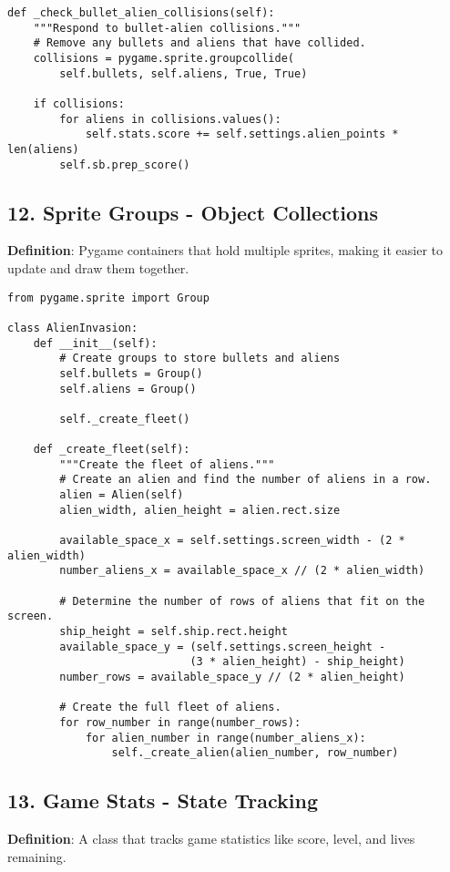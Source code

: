 \begin{lstlisting}
def _check_bullet_alien_collisions(self):
    """Respond to bullet-alien collisions."""
    # Remove any bullets and aliens that have collided.
    collisions = pygame.sprite.groupcollide(
        self.bullets, self.aliens, True, True)
    
    if collisions:
        for aliens in collisions.values():
            self.stats.score += self.settings.alien_points * len(aliens)
        self.sb.prep_score()
\end{lstlisting}

\subsection*{12. Sprite Groups - Object Collections}
\textbf{Definition}: Pygame containers that hold multiple sprites, making it easier to update and draw them together.

\begin{lstlisting}
from pygame.sprite import Group

class AlienInvasion:
    def __init__(self):
        # Create groups to store bullets and aliens
        self.bullets = Group()
        self.aliens = Group()
        
        self._create_fleet()
    
    def _create_fleet(self):
        """Create the fleet of aliens."""
        # Create an alien and find the number of aliens in a row.
        alien = Alien(self)
        alien_width, alien_height = alien.rect.size
        
        available_space_x = self.settings.screen_width - (2 * alien_width)
        number_aliens_x = available_space_x // (2 * alien_width)
        
        # Determine the number of rows of aliens that fit on the screen.
        ship_height = self.ship.rect.height
        available_space_y = (self.settings.screen_height -
                            (3 * alien_height) - ship_height)
        number_rows = available_space_y // (2 * alien_height)
        
        # Create the full fleet of aliens.
        for row_number in range(number_rows):
            for alien_number in range(number_aliens_x):
                self._create_alien(alien_number, row_number)
\end{lstlisting}

\subsection*{13. Game Stats - State Tracking}
\textbf{Definition}: A class that tracks game statistics like score, level, and lives remaining.

